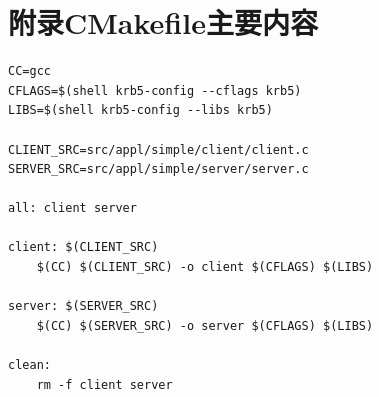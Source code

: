 ﻿\documentclass[12pt]{ctexart}
\begin{document}
\section*{附录C\quad Makefile主要内容}

\begin{lstlisting}[language={}]
CC=gcc
CFLAGS=$(shell krb5-config --cflags krb5)
LIBS=$(shell krb5-config --libs krb5)

CLIENT_SRC=src/appl/simple/client/client.c
SERVER_SRC=src/appl/simple/server/server.c

all: client server

client: $(CLIENT_SRC)
	$(CC) $(CLIENT_SRC) -o client $(CFLAGS) $(LIBS)

server: $(SERVER_SRC)
	$(CC) $(SERVER_SRC) -o server $(CFLAGS) $(LIBS)

clean:
	rm -f client server
\end{lstlisting}
\end{document}
